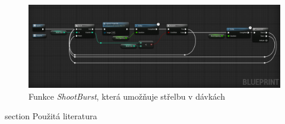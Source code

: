 \documentclass[12pt,a4paper,hidelinks]{article}
\begin{document}
\begin{figure}[h!]
\centering
\includegraphics[width=1.0\linewidth]{images/shoot_burst.png}
\caption{Funkce \textit{ShootBurst}, která umožňuje střelbu v dávkách}
\label{burst}
\end{figure}
\clearpage



\printbibliography
{} {section} {Použitá literatura}
\end{document}
